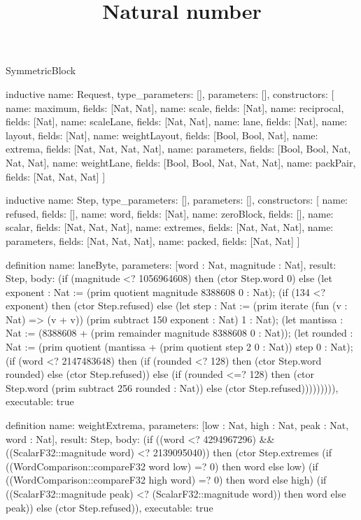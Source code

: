 \begin{lexlean}{SymmetricBlock}
\title{Natural number}
\begin{semanticmodule}
inductive{
  name: Request,
  type_parameters: [],
  parameters: [],
  constructors: [
    {name: maximum, fields: [Nat, Nat]},
    {name: scale, fields: [Nat]},
    {name: reciprocal, fields: [Nat]},
    {name: scaleLane, fields: [Nat, Nat]},
    {name: lane, fields: [Nat]},
    {name: layout, fields: [Nat]},
    {name: weightLayout, fields: [Bool, Bool, Nat]},
    {name: extrema, fields: [Nat, Nat, Nat, Nat]},
    {name: parameters, fields: [Bool, Bool, Nat, Nat, Nat]},
    {name: weightLane, fields: [Bool, Bool, Nat, Nat, Nat]},
    {name: packPair, fields: [Nat, Nat, Nat]}
  ]
}

inductive{
  name: Step,
  type_parameters: [],
  parameters: [],
  constructors: [
    {name: refused, fields: []},
    {name: word, fields: [Nat]},
    {name: zeroBlock, fields: []},
    {name: scalar, fields: [Nat, Nat, Nat]},
    {name: extremes, fields: [Nat, Nat, Nat]},
    {name: parameters, fields: [Nat, Nat, Nat]},
    {name: packed, fields: [Nat, Nat]}
  ]
}

definition{
  name: laneByte,
  parameters: [word : Nat, magnitude : Nat],
  result: Step,
  body: (if (magnitude <? 1056964608) then (ctor Step.word 0) else (let exponent : Nat := (prim quotient magnitude 8388608 0 : Nat); (if (134 <? exponent) then (ctor Step.refused) else (let step : Nat := (prim iterate (fun (v : Nat) => (v + v)) (prim subtract 150 exponent : Nat) 1 : Nat); (let mantissa : Nat := (8388608 + (prim remainder magnitude 8388608 0 : Nat)); (let rounded : Nat := (prim quotient (mantissa + (prim quotient step 2 0 : Nat)) step 0 : Nat); (if (word <? 2147483648) then (if (rounded <? 128) then (ctor Step.word rounded) else (ctor Step.refused)) else (if (rounded <=? 128) then (ctor Step.word (prim subtract 256 rounded : Nat)) else (ctor Step.refused))))))))),
  executable: true
}

definition{
  name: weightExtrema,
  parameters: [low : Nat, high : Nat, peak : Nat, word : Nat],
  result: Step,
  body: (if ((word <? 4294967296) && ((ScalarF32::magnitude word) <? 2139095040)) then (ctor Step.extremes (if ((WordComparison::compareF32 word low) =? 0) then word else low) (if ((WordComparison::compareF32 high word) =? 0) then word else high) (if ((ScalarF32::magnitude peak) <? (ScalarF32::magnitude word)) then word else peak)) else (ctor Step.refused)),
  executable: true
}


\end{semanticmodule}
\end{lexlean}
